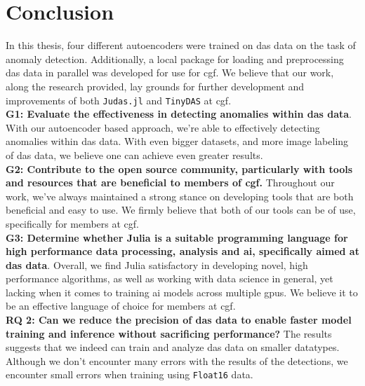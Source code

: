 \section{Conclusion}

In this thesis, four different autoencoders were trained on \acrshort{das} data on the task of anomaly detection. Additionally, a local package for loading and preprocessing \acrshort{das} data in parallel was developed for use for \acrfull{cgf}. We believe that our work, along the research provided, lay grounds for further development and improvements of both \texttt{Judas.jl} and \texttt{TinyDAS} at \acrshort{cgf}. \\ 


\textbf{G1: Evaluate the effectiveness in detecting anomalies within \acrshort{das} data}. With our autoencoder based approach, we're able to effectively detecting anomalies within \acrshort{das} data. With even bigger datasets, and more image labeling of \acrshort{das} data, we believe one can achieve even greater results. \\

\textbf{G2: Contribute to the open source community, particularly with tools and resources that are beneficial to members of \acrshort{cgf}.} Throughout our work, we've always maintained a strong stance on developing tools that are both beneficial and easy to use. We firmly believe that both of our tools can be of use, specifically for members at \acrshort{cgf}.  \\ 

\textbf{G3: Determine whether Julia is a suitable programming language for 
 high performance data processing, analysis and \acrshort{ai}, specifically aimed at \acrshort{das} data}. Overall, we find Julia satisfactory in developing novel, high performance algorithms, as well as working with data science in general, yet lacking when it comes to training \acrshort{ai} models across multiple \acrshort{gpu}s. We believe it to be an effective language of choice for members at \acrshort{cgf}.\\

\textbf{RQ 2: Can we reduce the precision of \acrshort{das} data to enable faster model training and inference without sacrificing performance?} The results suggests that we indeed can train and analyze \acrshort{das} data on smaller datatypes. Although we don't encounter many errors with the results of the detections, we encounter small errors when training using \texttt{Float16} data. \\
